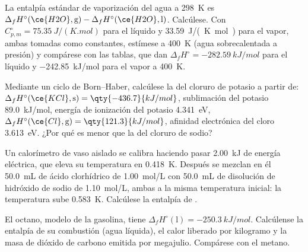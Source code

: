 \begin{exercise}[$\star\star$]\label{exo:b2:reaction-enthalpy:6}
La entalpía estándar de vaporización del agua a \qty{298}{K} es
$\Delta_f H^\circ(\ce{H2O}, \text{g}) - \Delta_f H^\circ(\ce{H2O},
\text{l})$. Calcúlese. Con $C_{p,m}^\circ = \qty{75.35}{J/(K.mol)}$ para
el líquido y \qty{33.59}{J/(K.mol)} para el vapor, ambas tomadas como
constantes, estímese a \qty{400}{K} (agua sobrecalentada a presión)
y compárese con las tablas, que dan $\Delta_f H^\circ =
\qty{-282.59}{kJ/mol}$ para el líquido y \qty{-242.85}{kJ/mol} para el
vapor a \qty{400}{K}.
\end{exercise}

\begin{exercise}[$\star\star$]\label{exo:b2:reaction-enthalpy:7}
Mediante un ciclo de Born--Haber, calcúlese la  del cloruro
de potasio a partir de: $\Delta_f H^\circ(\ce{KCl}, \text{s}) = \qty{-436.7}{kJ/mol}$,
sublimación del potasio \qty{89.0}{kJ/mol}, energía de ionización del
potasio \qty{4.341}{eV}, $\Delta_f H^\circ(\ce{Cl}, \text{g}) =
\qty{121.3}{kJ/mol}$, afinidad electrónica del cloro \qty{3.613}{eV}. ¿Por qué
es menor que la del cloruro de sodio?
\end{exercise}

\begin{exercise}[$\star\star$]\label{exo:b2:reaction-enthalpy:8}
Un calorímetro de vaso aislado se calibra haciendo pasar \qty{2.00}{kJ} de
energía eléctrica, que eleva su temperatura en \qty{0.418}{K}. Después
se mezclan en él \qty{50.0}{mL} de ácido clorhídrico de \qty{1.00}{mol/L}
con \qty{50.0}{mL} de disolución de hidróxido de sodio de \qty{1.10}{mol/L},
ambas a la misma temperatura inicial: la temperatura sube
\qty{0.583}{K}. Calcúlese la entalpía de .
\end{exercise}

\begin{exercise}[$\star\star$]\label{exo:b2:reaction-enthalpy:9}
El octano, modelo de la gasolina, tiene $\Delta_f H^\circ(\text{l}) =
\qty{-250.3}{kJ/mol}$. Calcúlense la entalpía de su combustión (agua
líquida), el calor liberado por kilogramo y la masa de dióxido de carbono
emitida por megajulio. Compárese con el metano.
\end{exercise}

